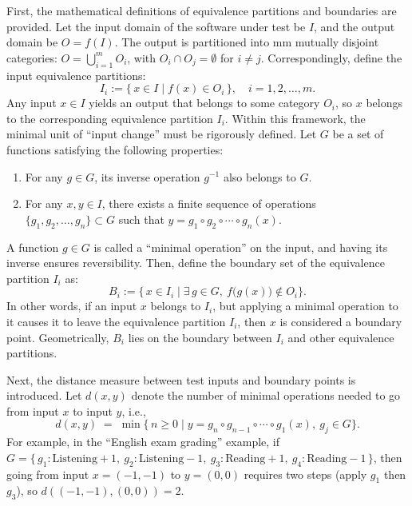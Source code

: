 \documentclass[manuscript,screen,review]{acmart}
\begin{document}
First, the mathematical definitions of equivalence partitions and boundaries are provided. Let the input domain of the software under test be $I$, and the output domain be $O = f(I)$. The output is partitioned into mm mutually disjoint categories: $O = \bigcup_{i=1}^m O_i$, with $O_i \cap O_j = \emptyset$ for $i \neq j$. Correspondingly, define the input equivalence partitions:
\begin{equation}
I_i := \{\, x \in I \mid f(x) \in O_i \,\}, \quad i = 1,2,\ldots,m. \tag{1}
\end{equation}
Any input $x \in I$ yields an output that belongs to some category $O_i$, so $x$ belongs to the corresponding equivalence partition $I_i$. Within this framework, the minimal unit of ``input change'' must be rigorously defined. Let $G$ be a set of functions satisfying the following properties:
\begin{enumerate}
  \item For any $g \in G$, its inverse operation $g^{-1}$ also belongs to $G$.
  \item For any $x,y \in I$, there exists a finite sequence of operations $\{g_1, g_2, \ldots, g_n\} \subset G$ such that $y = g_1 \circ g_2 \circ \cdots \circ g_n(x)$.
\end{enumerate}
A function $g \in G$ is called a ``minimal operation'' on the input, and having its inverse ensures reversibility. Then, define the boundary set of the equivalence partition $I_i$ as:
\begin{equation}
B_i := \bigl\{\, x \in I_i \mid \exists\, g \in G,\ f\bigl(g(x)\bigr) \notin O_i \bigr\}. \tag{2}
\end{equation}
In other words, if an input $x$ belongs to $I_i$, but applying a minimal operation to it causes it to leave the equivalence partition $I_i$, then $x$ is considered a boundary point. Geometrically, $B_i$ lies on the boundary between $I_i$ and other equivalence partitions.

Next, the distance measure between test inputs and boundary points is introduced. Let $d(x,y)$ denote the number of minimal operations needed to go from input $x$ to input $y$, i.e.,
\begin{equation}
d(x,y) \;=\; \min\bigl\{\, n \ge 0 \mid y = g_n \circ g_{n-1} \circ \cdots \circ g_1(x),\ g_j \in G \bigr\}. \tag{3}
\end{equation}
For example, in the ``English exam grading'' example, if $G = \{\, g_1:\text{Listening}+1,\ g_2:\text{Listening}-1,\ g_3:\text{Reading}+1,\ g_4:\text{Reading}-1 \,\}$, then going from input $x = (-1,-1)$ to $y=(0,0)$ requires two steps (apply $g_1$ then $g_3$), so $d((-1,-1),(0,0)) = 2$.
\end{document}
